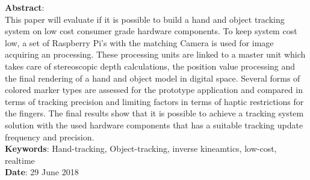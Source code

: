 \begin{titlepage}
\textbf{Abstract}: \\This paper will evaluate if it is possible to build a hand and object tracking system on low cost consumer grade hardware components. To keep system cost low, a set of Raspberry Pi's with the matching Camera is used for image acquiring an processing. These processing units are linked to a master unit which takes care of stereoscopic depth calculations, the position value processing and the final rendering of a hand and object model in digital space. Several forms of colored marker types are assessed for the prototype application and compared in terms of tracking precision and limiting factors in terms of haptic restrictions for the fingers. The final results show that it is possible to achieve a tracking system solution with the used hardware components that has a suitable tracking update frequency and precision.\\
\textbf{Keywords}: Hand-tracking, Object-tracking, inverse kineamtics, low-cost, realtime \\
\textbf{Date}: 29 June 2018\\

\end{titlepage}
